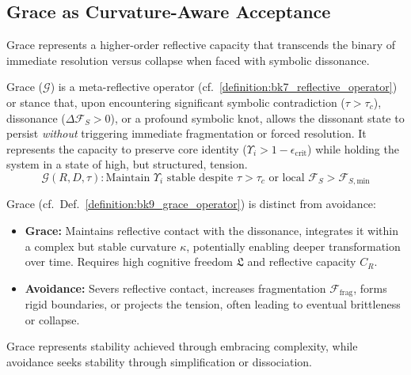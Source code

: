 \subsection{Grace as Curvature-Aware Acceptance}
\label{subsec:bk9_grace_as_curvature_aware_acceptance}
Grace represents a higher-order reflective capacity that transcends the binary of immediate resolution versus collapse when faced with symbolic dissonance.
\begin{definition}
\label{definition:bk9_grace_operator}
Grace ($\mathcal{G}$) is a meta-reflective operator (cf.~\ref{definition:bk7_reflective_operator}) or stance that, upon encountering significant symbolic contradiction ($\tau > \tau_c$), dissonance ($\Delta \mathcal{F}_S > 0$), or a profound symbolic knot, allows the dissonant state to persist \emph{without} triggering immediate fragmentation or forced resolution. It represents the capacity to preserve core identity ($\Upsilon_i > 1 - \epsilon_{\text{crit}}$) while holding the system in a state of high, but structured, tension.
\[
\mathcal{G}(R, D, \tau): \text{Maintain } \Upsilon_i \text{ stable despite } \tau > \tau_c \text{ or local } \mathcal{F}_S > \mathcal{F}_{S, \text{min}}
\]
\end{definition}
\begin{proposition}
\label{proposition:bk9_grace_vs_avoidance}
Grace (cf.~Def.~\ref{definition:bk9_grace_operator}) is distinct from avoidance:
\begin{itemize}
    \item \textbf{Grace:} Maintains reflective contact with the dissonance, integrates it within a complex but stable curvature $\kappa$, potentially enabling deeper transformation over time. Requires high cognitive freedom $\mathfrak{L}$ and reflective capacity $C_R$.
    \item \textbf{Avoidance:} Severs reflective contact, increases fragmentation $\mathcal{F}_{\text{frag}}$, forms rigid boundaries, or projects the tension, often leading to eventual brittleness or collapse.
\end{itemize}
Grace represents stability achieved through embracing complexity, while avoidance seeks stability through simplification or dissociation.
\end{proposition}
